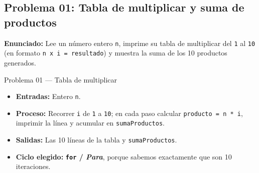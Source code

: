 \documentclass[11pt,letterpaper]{article}
\begin{document}
\subsection{Problema 01: Tabla de multiplicar y suma de productos}

\textbf{Enunciado:} Lee un número entero \texttt{n}, imprime su tabla de multiplicar del \texttt{1} al \texttt{10} (en formato \texttt{n x i = resultado}) y muestra la suma de los 10 productos generados.

\begin{analisis}{Problema 01 --- Tabla de multiplicar}
\begin{itemize}
  \item \textbf{Entradas:} Entero \texttt{n}.
  \item \textbf{Proceso:} Recorrer \texttt{i} de \texttt{1} a \texttt{10}; en cada paso calcular \texttt{producto = n * i}, imprimir la línea y acumular en \texttt{sumaProductos}.
  \item \textbf{Salidas:} Las 10 líneas de la tabla y \texttt{sumaProductos}.
  \item \textbf{Ciclo elegido:} \textbf{\texttt{for} / \textit{Para}}, porque sabemos exactamente que son 10 iteraciones.
\end{itemize}
\end{analisis}





\end{document}
